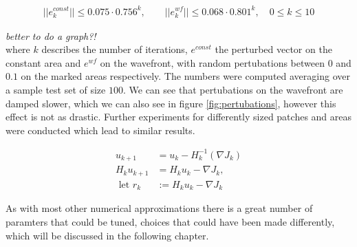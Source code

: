 \documentclass[../draft_1.tex]{subfiles}
\begin{document}
\begin{ceqn}
	\begin{equation}
	\begin{aligned}
|| e_k^{const} || \leq 0.075 \cdot 0.756^k, \qquad || e_k^{wf} || \leq 0.068 \cdot 0.801^k, \quad 0 \leq k \leq 10
	\end{aligned}
	\end{equation}
\end{ceqn}
\textit{better to do a graph?!} 
\smallskip
\\
where $k$ describes the number of iterations, $e^{const}$ the perturbed vector on the constant area and $e^{wf}$ on the wavefront, with random pertubations between $0$ and $0.1$ on the marked areas respectively. The numbers were computed averaging over a sample test set of size $100$. We can see that pertubations on the wavefront are damped slower, which we can also see in figure \ref{fig:pertubations}, however this effect is not as drastic. Further experiments for differently sized patches and areas were conducted which lead to similar results. 



\begin{ceqn}
	\begin{equation}
\begin{aligned}
	u_{k+1} &= u_k - H_k^{-1}(\nabla J_k) \\
	H_k u_{k+1} &= H_k u_k - \nabla J_k, \\ 
	\text{ let } r_k &:= H_k u_k - \nabla J_k
\end{aligned}
\end{equation}
\end{ceqn}




As with most other numerical approximations there is a great number of paramters that could be tuned, choices that could have been made differently, which will be discussed in the following chapter.
\end{document}
